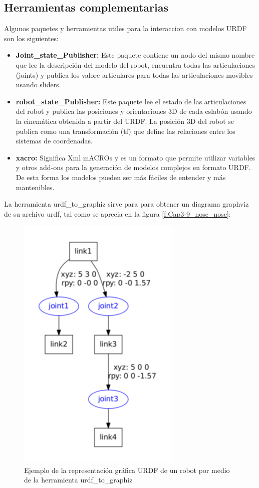                                                 \newpage

    \subsection{Herramientas complementarias}
    
        Algunos paquetes y herramientas utiles para la interaccion con modelos URDF son los siguientes:
      
        \begin{itemize}
            \item \textbf{Joint\_state\_Publisher:} Este paquete contiene un nodo del mismo nombre que lee la descripción del modelo del robot, encuentra todas las articulaciones (joints) y publica los valore articulares para todas las articulaciones movibles usando sliders.
            \item \textbf{robot\_state\_Publisher:} Este paquete lee el estado de las articulaciones del robot y publica las posiciones y orientaciones 3D de cada eslabón usando la cinemática obtenida a partir del URDF. La posición 3D del robot se publica como una transformación (tf) que define las relaciones entre los sistemas de coordenadas.
            \item \textbf{xacro:} Significa Xml mACROs y es un formato que permite utilizar variables y otros add-ons para la generación de modelos complejos en formato URDF. De esta forma los modelos pueden ser más fáciles de entender y más mantenibles.
        \end{itemize}      
        
        La herramienta urdf\_to\_graphiz sirve para para obtener un diagrama graphviz de su archivo urdf, tal como se aprecia en la figura \eqref{f:Cap3-9_nose_nose}:
        
        \begin{figure}[htb]
            \centering
            \includegraphics[width=0.43\linewidth]{Main/Chapter3/Images3/3-9/Esquema-de-los-componentes-de-un-fichero-urdf.png}
            \caption{Ejemplo de la representación gráfica URDF de un robot por medio de la herramienta urdf\_to\_graphiz \cite{urdftutorials}}
            \label{f:Cap3-9_nose_nose}
        \end{figure} 
        
